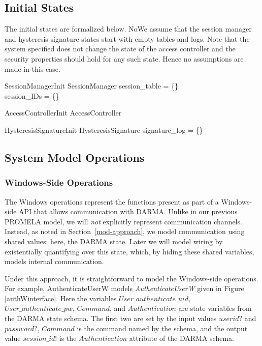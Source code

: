 \documentclass[a4paper,pdftex]{article}
\newcommand{\AuthenticateUserW}{\emph{AuthenticateUserW}}
\begin{document}
\subsection{Initial States}

The initial states are formalized below.  NoWe assume that
the session manager and hysteresis signature states start
with empty tables and logs.  Note that the system specified does not
change the state of the access controller and the security properties
should hold for any such state. Hence no assumptions are made
in this case.

\begin{schema}{SessionManagerInit}
  SessionManager
  \where
  session\_table = \{\}\\
  session\_IDs = \{\}
\end{schema}

\begin{schema}{AccessControllerInit}
  AccessController
\end{schema}


\begin{schema}{HysteresisSignatureInit}
  HysteresisSignature
  \where
  signature\_log = \{\}
\end{schema}


\subsection{System Model Operations}

\subsubsection{Windows-Side Operations} \label{win-spec-sec}

The Windows operations represent the functions present as part of a
Windows-side API that allows communication with DARMA.  Unlike in our
previous PROMELA model, we will \emph{not} explicitly represent
communication channels.  Instead, as noted in
Section~\ref{mod-approach}, 
we model communication using shared values: here, the
DARMA state.  Later we will model wiring by existentially quantifying
over this state, which, by hiding these shared variables, models
internal communication.

Under this approach, it is straightforward to model the
Windows-side operations.  For example,  AuthenticateUserW models
\AuthenticateUserW{} given in Figure \ref{authWinterface}.  Here
the variables $User\_authenticate\_uid$,
$User\_authenticate\_pw$, $Command$, and $Authentication$ are state
variables from the DARMA state schema.  The first two are set
by the input values $userid?$ and $password?$, $Command$ is the command
named by the schema, and the output value $session\_id!$ is the
$Authentication$ attribute of the DARMA schema.
\end{document}

